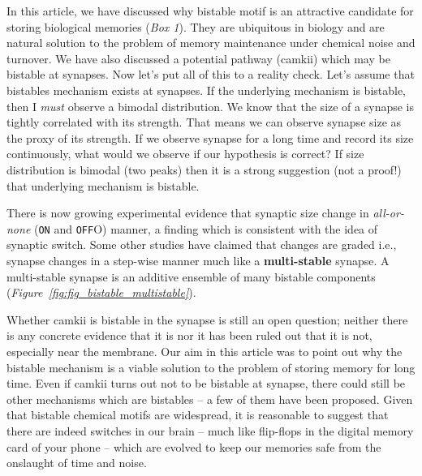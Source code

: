 \documentclass[]{resonance}
\newcommand\Fig[1]{\textit{Figure~\ref{#1}}}
\begin{document}
In this article, we have discussed why bistable motif is an attractive candidate
for storing biological memories (\textit{Box 1}). They are ubiquitous in biology
and are natural solution to the problem of memory maintenance under chemical
noise and turnover.  We have also discussed a potential pathway (\gls{camkii})
which may be bistable at synapses. Now let's put all of this to a reality check.
Let's assume that bistables mechanism exists at synapses. If the underlying
mechanism is bistable, then I \emph{must} observe a bimodal distribution. We
know that the size of a synapse is tightly correlated with its strength. That
means we can observe synapse size as the proxy of its strength.  If we observe
synapse for a long time and record its size continuously, what would we observe
if our hypothesis is correct? If size distribution is bimodal (two peaks) then
it is a strong suggestion (not a proof!) that underlying mechanism is bistable. 

There is now growing experimental evidence that synaptic size change in
\textit{all-or-none} (\texttt{ON} and \texttt{OFF}O) manner, a finding which is
consistent with the idea of synaptic switch. Some other studies have claimed
that changes are graded i.e., synapse changes in a step-wise manner much like a
\textbf{multi-stable} synapse. A multi-stable synapse is an additive ensemble of
many bistable components (\Fig{fig:fig_bistable_multistable}).


Whether \gls{camkii} is bistable in the synapse is still an open question;
neither there is any concrete evidence that it is nor it has been ruled out that
it is not, especially near the membrane. Our aim in this article was to point
out why the bistable mechanism is a viable solution to the problem of storing memory
for long time. Even if \gls{camkii} turns out not to be bistable at synapse,
there could still be other mechanisms which are bistables -- a few of them have
been proposed. Given that bistable chemical motifs are widespread, it is
reasonable to suggest that there are indeed switches in our brain -- much like
flip-flops in the digital memory card of your phone -- which are evolved to keep
our memories safe from the onslaught of time and noise.

\end{document}
